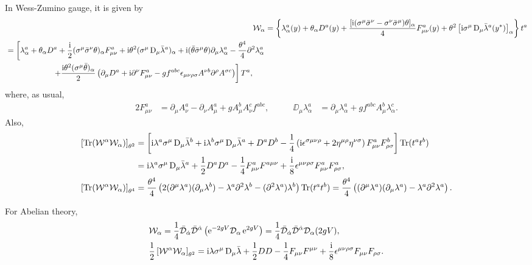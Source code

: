 \documentclass[CheatSheet]{subfiles}
\newcommand{\OD}{{\mathcal D}}
\begin{document}
In Wess-Zumino gauge, it is given by
\begin{align}
\mathcal W_\alpha &=\left\{
\lambda_{\alpha}^{a}(y)+\theta_\alpha D^{a}(y)+\frac{[\mathrm{i}(\sigma^{\mu}\bar\sigma^{\nu}-\sigma^{\nu}\bar\sigma^{\mu})\theta]_\alpha}{4} F^a_{\mu\nu}(y)
+\theta^2 \left[\mathrm{i}\sigma^{\mu}\mathop{}\!\mathrm{D}_\mu\bar{\lambda}^a(y^*)\right]_\alpha
\right\}t^a
\\\begin{split}&=\left[
\lambda_{\alpha}^{a}+\theta_\alpha D^{a}+\frac{\mathrm{i}}{2} (\sigma^{\mu}\bar\sigma^{\nu}\theta)_\alpha F^a_{\mu\nu}
+\mathrm{i} \theta^2(\sigma^{\mu}\mathop{}\!\mathrm{D}_{\mu}\bar{\lambda}^{a})_\alpha
+\mathrm{i}(\bar\theta\bar\sigma^{\mu}\theta)\partial_{\mu}\lambda _{\alpha}^{a}
-\frac{\theta^4}{4} \partial^2\lambda _{\alpha}^{a}
\right.\\&\qquad\qquad\qquad\left.
+\frac{\mathrm{i}\theta^2(\sigma^{\mu}\bar\theta)_{\alpha}}{2} \left(\partial_{\mu}D^{a}
+\mathrm{i}\partial^\nu F^a_{\mu\nu}
- gf^{abc}\epsilon_{\mu\nu \rho\sigma}  A^{\nu b}\partial^{\rho}A^{\sigma c}
\right)\right]T^{a},
\end{split}
\end{align}
where, as usual,
\begin{alignat}{2}
F^a_{\mu\nu}&=\partial_{\mu}A_\nu^a-\partial_{\nu}A_\mu^a+g A_\mu^b A_\nu^c f^{abc},
&\qquad
\DD_\mu\lambda^a_\alpha
&=\partial_{\mu}\lambda^{a}_\alpha+g f^{abc}A_\mu^{b}\lambda^{c}_\alpha.
\end{alignat}
Also,
\begin{align}
 \left[\operatorname{\mathrm{Tr}}(\mathcal W^\alpha\mathcal W_\alpha)\right]_{\theta^2}
&=
\left[
\mathrm{i}\lambda^a\sigma^{\mu}\mathop{}\!\mathrm{D}_{\mu}\bar{\lambda}^{b}
+\mathrm{i}\lambda^b\sigma^{\mu}\mathop{}\!\mathrm{D}_{\mu}\bar{\lambda}^{a}
+D^a D^{b}
-\frac{1}{4}\left(\mathrm{i} \epsilon^{\sigma\mu \nu\rho}+2\eta^{\mu\rho}\eta^{\nu\sigma}\right)
F^a_{\mu\nu}F^b_{\rho\sigma}
\right]
\operatorname{\mathrm{Tr}}(t^at^b)
\\
&=
\mathrm{i}\lambda^a\sigma^{\mu}\mathop{}\!\mathrm{D}_{\mu}\bar{\lambda}^a
+\frac12D^a D^a
-\frac14F^a_{\mu\nu}F^{a\mu\nu}
+\frac{\mathrm{i}}{8}\epsilon^{\mu \nu\rho\sigma}
F^a_{\mu\nu}F^a_{\rho\sigma},
\\
 \left[\operatorname{\mathrm{Tr}}(\mathcal W^\alpha\mathcal W_\alpha)\right]_{\theta^4}
&=
\frac{\theta^4}{4} \left(2 (\partial^{\mu}\lambda^{a})(\partial_{\mu}\lambda^{b})-\lambda^{a}\partial^2\lambda^{b}-(\partial^2\lambda^{a})\lambda^b\right)\operatorname{\mathrm{Tr}}(t^at^b)
=
\frac{\theta^4}{4} \left((\partial^{\mu}\lambda^{a})(\partial_{\mu}\lambda^{a})-\lambda^{a}\partial^2\lambda^{a}\right).
\end{align}

For Abelian theory,
\begin{align}
& \mathcal W_\alpha = \frac14\bar\OD_\dalpha\bar\OD^\dalpha\left(\ee^{-2gV}\OD_\alpha\ee^{2gV}\right)
=\frac14\bar\OD_\dalpha\bar\OD^\dalpha\OD_\alpha(2gV),
\\
& \frac12\left[\mathcal W^\alpha\mathcal W_\alpha\right]_{\theta^2}
=\ii\lambda\sigma^{\mu}\DD_{\mu}\bar{\lambda}
+\frac12DD
-\frac14F_{\mu\nu}F^{\mu\nu}
+\frac{\ii}{8}\epsilon^{\mu \nu\rho\sigma}
F_{\mu\nu}F_{\rho\sigma}.
\end{align}
\end{document}
